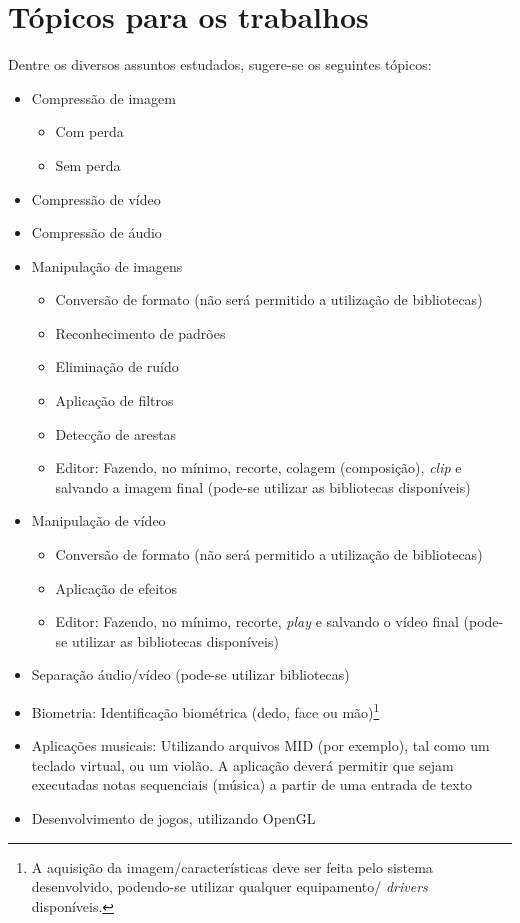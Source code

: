 \documentclass[a4paper,11pt]{article}
\begin{document}
\section*{Tópicos para os trabalhos}

Dentre os diversos assuntos estudados, sugere-se os seguintes tópicos: 

\begin{itemize}
    \item Compressão de imagem
    \begin{itemize}
        \item Com perda
        \item Sem perda
    \end{itemize}
    \item Compressão de vídeo
    \item Compressão de áudio
    \item Manipulação de imagens
    \begin{itemize}
        \item Conversão de formato (não será permitido a utilização de
              bibliotecas)
        \item Reconhecimento de padrões
        \item Eliminação de ruído
        \item Aplicação de filtros
        \item Detecção de arestas
        \item Editor: Fazendo, no mínimo, recorte, colagem (composição), {\it
              clip} e salvando a imagem final (pode-se utilizar as bibliotecas
              disponíveis)
    \end{itemize}
    \item Manipulação de vídeo
    \begin{itemize}
        \item Conversão de formato (não será permitido a utilização de
              bibliotecas)
        \item Aplicação de efeitos
        \item Editor: Fazendo, no mínimo, recorte, {\it play} e salvando o vídeo
              final (pode-se utilizar as bibliotecas disponíveis)
    \end{itemize}
    \item Separação áudio/vídeo (pode-se utilizar bibliotecas)
    \item Biometria: Identificação biométrica (dedo, face ou mão)\footnote{A
          aquisição da imagem/características deve ser feita pelo sistema
          desenvolvido, podendo-se utilizar qualquer equipamento/{\it
          drivers} disponíveis.}
    \item Aplicações musicais: Utilizando arquivos MID (por exemplo), tal como
          um teclado virtual, ou um violão. A aplicação deverá permitir que
          sejam executadas notas sequenciais (música) a partir de uma entrada de
          texto
    \item Desenvolvimento de jogos, utilizando OpenGL
\end{itemize}
\end{document}
